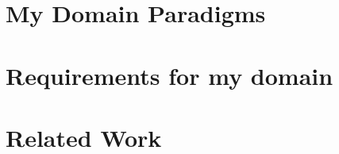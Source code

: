 %

\chapter{My Domain Paradigms}
\label{ch:my-domain}


\chapter{Requirements for my domain}
\label{ch:requirements}


\chapter{Related Work}
\label{ch:related-work}
